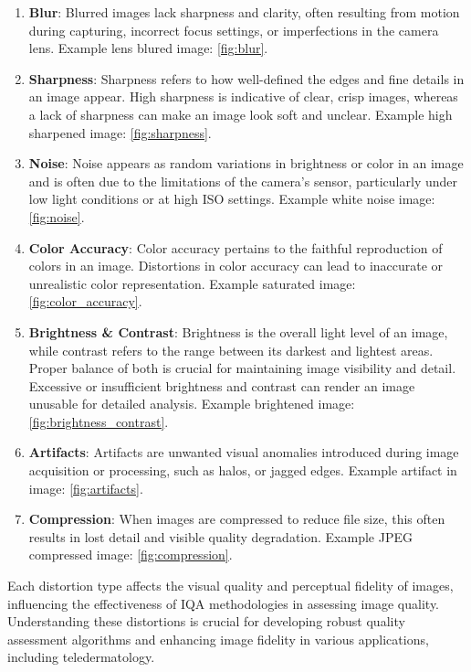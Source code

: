 \begin{enumerate}
    \item \textbf{Blur}: Blurred images lack sharpness and clarity, often resulting from motion during capturing, incorrect focus settings, or imperfections in the camera lens. Example lens blured image: \ref{fig:blur}.
    \item \textbf{Sharpness}: Sharpness refers to how well-defined the edges and fine details in an image appear. High sharpness is indicative of clear, crisp images, whereas a lack of sharpness can make an image look soft and unclear. Example high sharpened image: \ref{fig:sharpness}.
    \item \textbf{Noise}: Noise appears as random variations in brightness or color in an image and is often due to the limitations of the camera's sensor, particularly under low light conditions or at high ISO settings. Example white noise image: \ref{fig:noise}.
    \item \textbf{Color Accuracy}: Color accuracy pertains to the faithful reproduction of colors in an image. Distortions in color accuracy can lead to inaccurate or unrealistic color representation. Example saturated image: \ref{fig:color_accuracy}.
    \item \textbf{Brightness \& Contrast}: Brightness is the overall light level of an image, while contrast refers to the range between its darkest and lightest areas. Proper balance of both is crucial for maintaining image visibility and detail. Excessive or insufficient brightness and contrast can render an image unusable for detailed analysis. Example brightened image: \ref{fig:brightness_contrast}.
    \item \textbf{Artifacts}: Artifacts are unwanted visual anomalies introduced during image acquisition or processing, such as halos, or jagged edges. Example artifact in image: \ref{fig:artifacts}.
    \item \textbf{Compression}: When images are compressed to reduce file size, this often results in lost detail and visible quality degradation. Example JPEG compressed image: \ref{fig:compression}.
\end{enumerate}
Each distortion type affects the visual quality and perceptual fidelity of images, influencing the effectiveness of IQA methodologies in assessing image quality. Understanding these distortions is crucial for developing robust quality assessment algorithms and enhancing image fidelity in various applications, including teledermatology.

